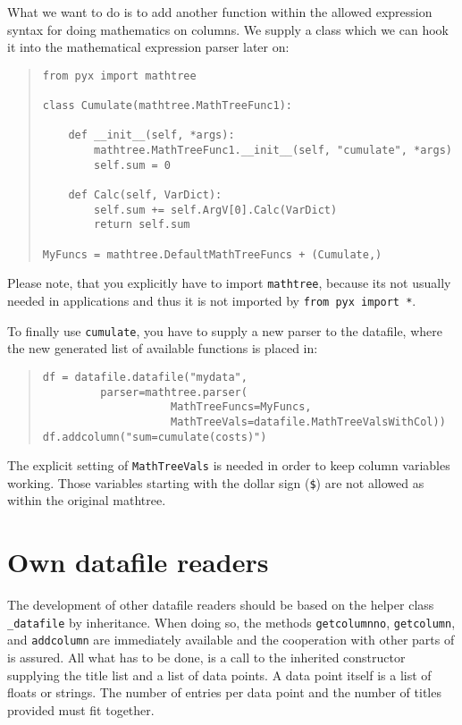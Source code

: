 What we want to do is to add another function within the allowed
expression syntax for doing mathematics on columns. We supply a class
which we can hook it into the mathematical expression parser later on:

\begin{quote}
\begin{verbatim}
from pyx import mathtree

class Cumulate(mathtree.MathTreeFunc1):

    def __init__(self, *args):
        mathtree.MathTreeFunc1.__init__(self, "cumulate", *args)
        self.sum = 0

    def Calc(self, VarDict):
        self.sum += self.ArgV[0].Calc(VarDict)
        return self.sum

MyFuncs = mathtree.DefaultMathTreeFuncs + (Cumulate,)
\end{verbatim}
\end{quote}

Please note, that you explicitly have to import \verb|mathtree|,
because its not usually needed in \PyX{} applications and thus it is
not imported by \verb|from pyx import *|.

To finally use \verb|cumulate|, you have to supply a new parser to the
datafile, where the new generated list of available functions is
placed in:

\begin{quote}
\begin{verbatim}
df = datafile.datafile("mydata",
         parser=mathtree.parser(
                    MathTreeFuncs=MyFuncs,
                    MathTreeVals=datafile.MathTreeValsWithCol))
df.addcolumn("sum=cumulate(costs)")
\end{verbatim}
\end{quote}

The explicit setting of \verb|MathTreeVals| is needed in order to keep
column variables working. Those variables starting with the dollar
sign (\verb|$|) are not allowed as within the original mathtree.

\section{Own datafile readers}

The development of other datafile readers should be based on the
helper class \verb|_datafile| by inheritance. When doing so, the
methods \verb|getcolumnno|, \verb|getcolumn|, and \verb|addcolumn| are
immediately available and the cooperation with other parts of \PyX{}
is assured. All what has to be done, is a call to the inherited
constructor supplying the title list and a list of data points. A data
point itself is a list of floats or strings. The number of entries per
data point and the number of titles provided must fit together.
